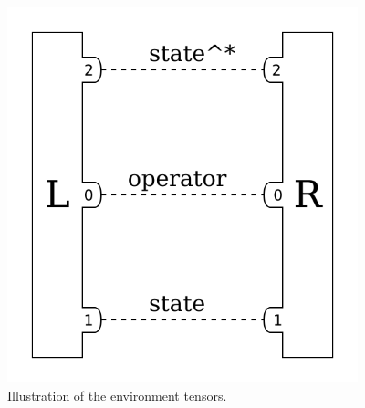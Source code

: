 \documentclass{article}
\newcommand{\diagramwidth}{4in}
\begin{document}
\begin{figure}\begin{center}
\includegraphics[width=\diagramwidth]{drawings/expectation_boundary_tensors-car}
\caption{\label{fig:environment-tensors-car} Illustration of the environment tensors.}
\end{center}\end{figure}
\end{document}
